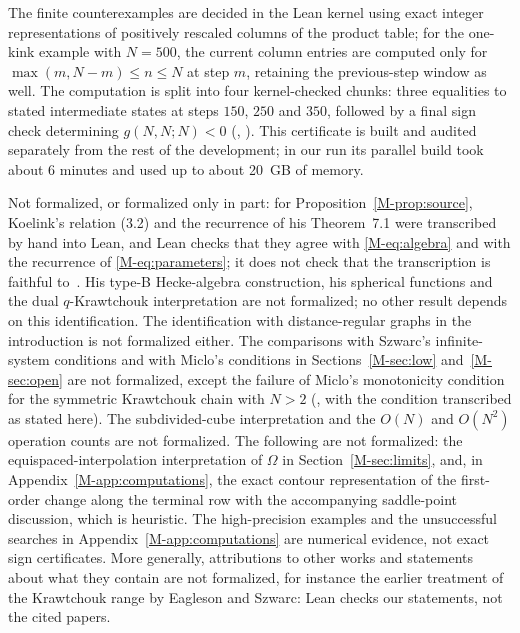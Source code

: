 The finite counterexamples are decided in the Lean kernel using exact integer representations of positively rescaled columns of the product table; for the one-kink example with $N=500$, the current column entries are computed only for $\max(m,N-m)\leq n\leq N$ at step $m$, retaining the previous-step window as well. The computation is split into four kernel-checked chunks: three equalities to stated intermediate states at steps $150$, $250$ and $350$, followed by a final sign check determining $g(N,N;N)<0$ (, ). This certificate is built and audited separately from the rest of the development; in our run its parallel build took about 6 minutes and used up to about 20~GB of memory.

Not formalized, or formalized only in part: for Proposition~\ref{M-prop:source}, Koelink's relation (3.2) and the recurrence of his Theorem~7.1 were transcribed by hand into Lean, and Lean checks that they agree with \eqref{M-eq:algebra} and with the recurrence of \eqref{M-eq:parameters}; it does not check that the transcription is faithful to~\cite{koelink}. His type-B Hecke-algebra construction, his spherical functions and the dual $q$-Krawtchouk interpretation are not formalized; no other result depends on this identification. The identification with distance-regular graphs in the introduction is not formalized either. The comparisons with Szwarc's infinite-system conditions and with Miclo's conditions in Sections~\ref{M-sec:low} and~\ref{M-sec:open} are not formalized, except the failure of Miclo's monotonicity condition for the symmetric Krawtchouk chain with $N>2$ (, with the condition transcribed as stated here). The subdivided-cube interpretation and the $O(N)$ and $O(N^2)$ operation counts are not formalized. The following are not formalized: the equispaced-interpolation interpretation of $\Omega$ in Section~\ref{M-sec:limits}, and, in Appendix~\ref{M-app:computations}, the exact contour representation of the first-order change along the terminal row with the accompanying saddle-point discussion, which is heuristic. The high-precision examples and the unsuccessful searches in Appendix~\ref{M-app:computations} are numerical evidence, not exact sign certificates. More generally, attributions to other works and statements about what they contain are not formalized, for instance the earlier treatment of the Krawtchouk range by Eagleson and Szwarc: Lean checks our statements, not the cited papers.

